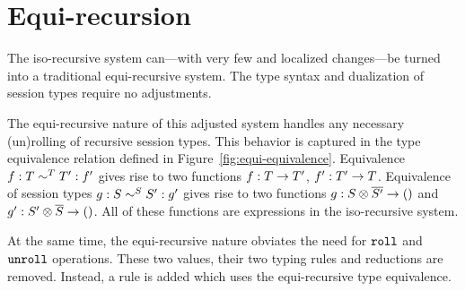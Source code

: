 \section{Equi-recursion}

The iso-recursive system can---with very few and localized changes---be turned
into a traditional equi-recursive system. The type syntax and dualization of
session types require no adjustments.



The equi-recursive nature of this adjusted system handles any necessary
(un)rolling of recursive session types. This behavior is captured in the type
equivalence relation defined in Figure~\ref{fig:equi-equivalence}. Equivalence
$f : T \eqt T' : f'$ gives rise to two functions $f : \TFun {T} {T'}$, $f' :
\TFun {T'} {T}$. Equivalence of session types $g : S \eqs S' : g'$ gives rise
to two functions $g : \TFun {\TPair {S} {\TDual{S'}}} \TUnit$ and $g' :
\TFun {\TPair {S'} {\TDual{S}}} \TUnit$. All of these functions are
expressions in the iso-recursive system.

At the same time, the equi-recursive nature obviates the need for $\EkwRoll$
and $\EkwUnroll$ operations. These two values, their two typing rules and
reductions are removed. Instead, a rule is added which uses the equi-recursive
type equivalence.
\begin{mathpar}
\end{mathpar}


% 

